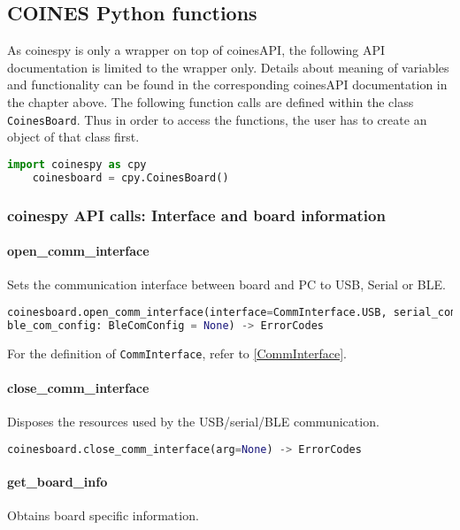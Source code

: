 \subsection{COINES Python functions}

As coinespy is only a wrapper on top of coinesAPI, the following API documentation is limited to the wrapper only. Details about meaning of variables and functionality can be found in the corresponding coinesAPI documentation in the chapter above.
\vspace{12pt}
The following function calls are defined within the class \texttt{CoinesBoard}. Thus in order to access the functions, the user has to create an object of that class first.

\begin{lstlisting}[language=python]
	import coinespy as cpy
	coinesboard = cpy.CoinesBoard()
\end{lstlisting}

\subsubsection{coinespy API calls: Interface and board information}

\paragraph{open\_comm\_interface}
Sets the communication interface between board and PC to USB, Serial or BLE.

\begin{lstlisting}[language=python]
coinesboard.open_comm_interface(interface=CommInterface.USB, serial_com_config: SerialComConfig = None,
ble_com_config: BleComConfig = None) -> ErrorCodes
\end{lstlisting}

For the definition of \texttt{CommInterface}, refer to \ref{CommInterface}.

\paragraph{close\_comm\_interface}
Disposes the resources used by the USB/serial/BLE communication.

\begin{lstlisting}[language=python]
coinesboard.close_comm_interface(arg=None) -> ErrorCodes
\end{lstlisting}

\paragraph{get\_board\_info}
Obtains board specific information.

